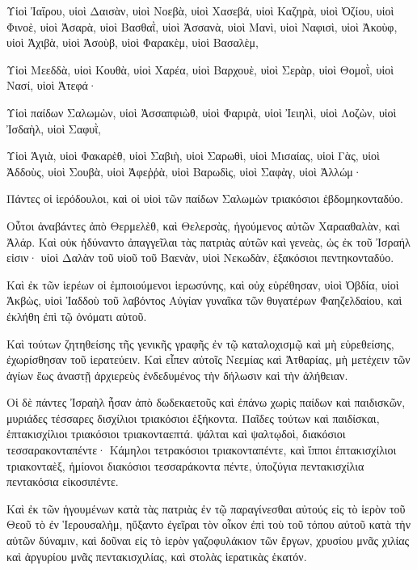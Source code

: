 {\par }{\PP {}Υἱοὶ Ἰαΐρου, υἱοὶ Δαισὰν, υἱοὶ Νοεβὰ, υἱοὶ Χασεβά, υἱοὶ Καζηρὰ, υἱοὶ Ὀζίου, υἱοὶ Φινοὲ, υἱοὶ Ἀσαρὰ, υἱοὶ Βασθαῒ, υἱοὶ Ἀσσανὰ, υἱοὶ Μανὶ, υἱοὶ Ναφισὶ, υἱοὶ Ἀκοὺφ, υἱοὶ Ἀχιβὰ, υἱοὶ Ἀσοὺβ, υἱοὶ Φαρακὲμ, υἱοὶ Βασαλὲμ,
\par }{\PP {}Υἱοὶ Μεεδδὰ, υἱοὶ Κουθὰ, υἱοὶ Χαρέα, υἱοὶ Βαρχουὲ, υἱοὶ Σερὰρ, υἱοὶ Θομοῒ, υἱοὶ Νασί, υἱοὶ Ἀτεφά·
\par }{\PP {}Υἱοὶ παίδων Σαλωμὼν, υἱοὶ Ἀσσαπφιὼθ, υἱοὶ Φαριρὰ, υἱοὶ Ἰειηλὶ, υἱοὶ Λοζὼν, υἱοὶ Ἰσδαὴλ, υἱοὶ Σαφυῒ,
\par }{\PP {}Υἱοὶ Ἁγιὰ, υἱοὶ Φακαρὲθ, υἱοὶ Σαβιὴ, υἱοὶ Σαρωθὶ, υἱοὶ Μισαίας, υἱοὶ Γὰς, υἱοὶ Ἀδδοὺς, υἱοὶ Σουβὰ, υἱοὶ Ἀφεῤῥὰ, υἱοὶ Βαρωδὶς, υἱοὶ Σαφὰγ, υἱοὶ Ἀλλώμ·
\par }{\PP {}Πάντες οἱ ἱερόδουλοι, καὶ οἱ υἱοὶ τῶν παίδων Σαλωμὼν τριακόσιοι ἑβδομηκονταδύο.
\par }{\PP {}Οὗτοι ἀναβάντες ἀπὸ Θερμελὲθ, καὶ Θελερσὰς, ἡγούμενος αὐτῶν Χαρααθαλὰν, καὶ Ἀλάρ.
Καὶ οὐκ ἠδύναντο ἀπαγγεῖλαι τὰς πατριὰς αὐτῶν καὶ γενεὰς, ὡς ἐκ τοῦ Ἰσραήλ εἰσιν· υἱοὶ Δαλὰν τοῦ υἱοῦ τοῦ Βαενὰν, υἱοὶ Νεκωδὰν, ἑξακόσιοι πεντηκονταδύο.
\par }{\PP {}Καὶ ἐκ τῶν ἱερέων οἱ ἐμποιούμενοι ἱερωσύνης, καὶ οὐχ εὑρέθησαν, υἱοὶ Ὀβδία, υἱοὶ Ἁκβὼς, υἱοὶ Ἰαδδοὺ τοῦ λαβόντος Αὐγίαν γυναῖκα τῶν θυγατέρων Φαηζελδαίου, καὶ ἐκλήθη ἐπὶ τῷ ὀνόματι αὐτοῦ.
\par }{\PP {}Καὶ τούτων ζητηθείσης τῆς γενικῆς γραφῆς ἐν τῷ καταλοχισμῷ καὶ μὴ εὑρεθείσης, ἐχωρίσθησαν τοῦ ἱερατεύειν.
Καὶ εἶπεν αὐτοῖς Νεεμίας καὶ Ἀτθαρίας, μὴ μετέχειν τῶν ἁγίων ἕως ἀναστῇ ἀρχιερεὺς ἐνδεδυμένος τὴν δήλωσιν καὶ τὴν ἀλήθειαν.
\par }{\PP {}Οἱ δὲ πάντες Ἰσραὴλ ἦσαν ἀπὸ δωδεκαετοῦς καὶ ἐπάνω χωρὶς παίδων καὶ παιδισκῶν, μυριάδες τέσσαρες δισχίλιοι τριακόσιοι ἑξήκοντα.
Παῖδες τούτων καὶ παιδίσκαι, ἑπτακισχίλιοι τριακόσιοι τριακονταεπτά. ψάλται καὶ ψαλτῳδοὶ, διακόσιοι τεσσαρακονταπέντε·
Κάμηλοι τετρακόσιοι τριακονταπέντε, καὶ ἵπποι ἑπτακισχίλιοι τριακονταὲξ, ἡμίονοι διακόσιοι τεσσαράκοντα πέντε, ὑποζύγια πεντακισχίλια πεντακόσια εἰκοσιπέντε.
\par }{\PP {}Καὶ ἐκ τῶν ἡγουμένων κατὰ τὰς πατριὰς ἐν τῷ παραγίνεσθαι αὐτούς εἰς τὸ ἱερὸν τοῦ Θεοῦ τὸ ἐν Ἱερουσαλὴμ, ηὔξαντο ἐγεῖραι τὸν οἶκον ἐπὶ τοὺ τοῦ τόπου αὐτοῦ κατὰ τὴν αὐτῶν δύναμιν,
καὶ δοῦναι εἰς τὸ ἱερὸν γαζοφυλάκιον τῶν ἔργων, χρυσίου μνᾶς χιλίας καὶ ἀργυρίου μνᾶς πεντακισχιλίας, καὶ στολὰς ἱερατικὰς ἑκατόν.
}
